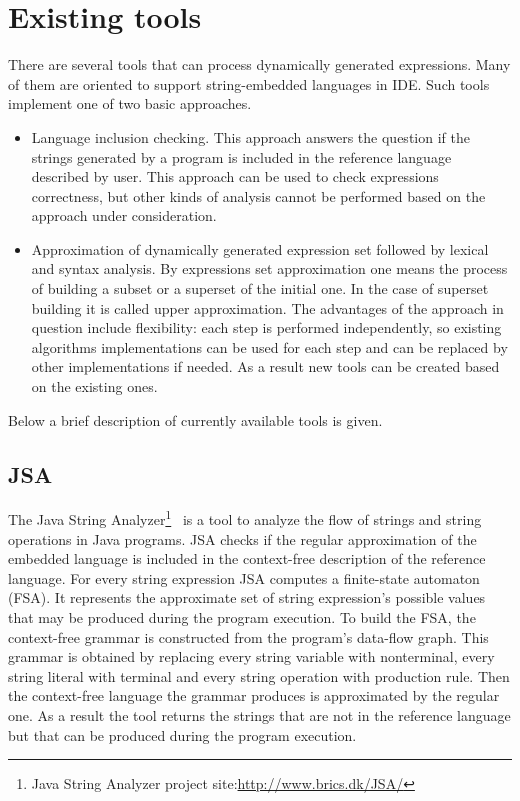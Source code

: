 \section{Existing tools}

There are several tools that can process dynamically generated expressions. Many of them are oriented to support string-embedded languages in IDE. Such tools implement one of two basic approaches. 
\begin{itemize}
\item{Language inclusion checking. This approach answers the question if the strings generated by a program is included in the reference language described by user. This approach can be used to check expressions correctness, but other kinds of analysis cannot be performed based on the approach under consideration.  }
\item{Approximation of dynamically generated expression set followed by lexical and syntax analysis. By expressions set approximation one means the process of building a subset or a superset of the initial one. In the case of superset building it is called upper approximation. The advantages of the approach in question include flexibility: each step is performed independently, so existing algorithms implementations can be used for each step and can be replaced by other implementations if needed. As a result new tools can be created based on the existing ones.}
\end{itemize}

Below a brief description of currently available tools is given.

\subsection{JSA}
The Java String Analyzer\footnote{Java String Analyzer project site:\url{http://www.brics.dk/JSA/}}~\cite{JSA:ref} is a tool to analyze the flow of strings and string operations in Java programs. JSA checks if the regular approximation of the embedded language is included in the context-free description of the reference language. For every string expression JSA computes a finite-state automaton (FSA). It represents the approximate set of string expression's possible values that may be produced during the program execution. To build the FSA, the context-free grammar is constructed from the program's data-flow graph. This grammar is obtained by replacing every string variable with nonterminal, every string literal with terminal and every string operation with production rule. Then the context-free language the grammar produces is approximated by the regular one. As a result the tool returns the strings that are not in the reference language but that can be produced during the program execution.


